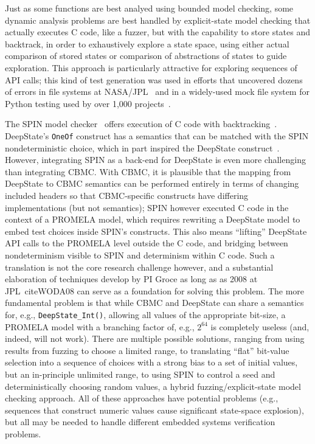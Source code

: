 Just as some functions are best analyed using bounded model checking, some dynamic analysis problems are best handled by explicit-state model checking that actually executes C code, like a fuzzer, but with the capability to store states and backtrack, in order to exhaustively explore a state space, using either actual comparison of stored states or comparison of abstractions of states to guide exploration.  This approach is particularly attractive for exploring sequences of API calls; this kind of test generation was used in efforts that uncovered dozens of errors in file systems at NASA/JPL~\cite{AMAI} and in a widely-used mock file system for Python testing used by over 1,000 projects~\cite{tstl}.

The SPIN model checker~\cite{SPIN} offers execution of C code with backtracking~\cite{ModelDriven,ModelCode}.  DeepState's {\tt OneOf} construct has a semantics that can be matched with the SPIN nondeterministic choice, which in part inspired the DeepState construct~\cite{WODA08,WODACommon}.  However, integrating SPIN as a back-end for DeepState is even more challenging than integrating CBMC.  With CBMC, it is plausible that the mapping from DeepState to CBMC semantics can be performed entirely in terms of changing included headers so that CBMC-specific constructs have differing implementations (but not semantics); SPIN however executed C code in the context of a PROMELA model, which requires rewriting a DeepState model to embed test choices inside SPIN's constructs.  This also means ``lifting'' DeepState API calls to the PROMELA level outside the C code, and bridging between nondeterminism visible to SPIN and determinism within C code.  Such a translation is not the core research challenge however, and a substantial elaboration of techniques develop by PI Groce as long as as 2008 at JPL~cite{WODA08} can serve as a foundation for solving this problem.  The more fundamental problem is that while CBMC and DeepState can share a semantics for, e.g., {\tt DeepState\_Int()}, allowing all values of the appropriate bit-size, a PROMELA model with a branching factor of, e.g., $2^{64}$ is completely useless (and, indeed, will not work).  There are multiple possible solutions, ranging from using results from fuzzing to choose a limited range, to translating ``flat'' bit-value selection into a sequence of choices with a strong bias to a set of initial values, but an in-principle unlimited range, to using SPIN to control a seed and deterministically choosing random values, a hybrid fuzzing/explicit-state model checking approach.  All of these approaches have potential problems (e.g., sequences that construct numeric values cause significant state-space explosion), but all may be needed to handle different embedded systems verification problems.